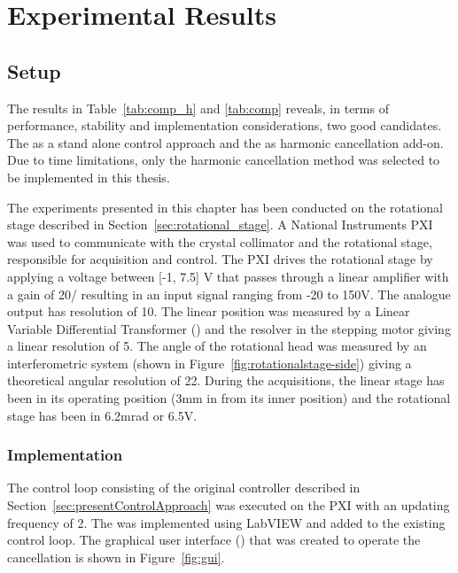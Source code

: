 \chapter{Experimental Results}\label{cha:exp_result}
\section{Setup}\label{sec:setup}
The results in Table~\ref{tab:comp_h} and \ref{tab:comp} reveals, in terms of performance, stability and implementation considerations, two good candidates. The \abbrIRC as a stand alone control approach and the \abbrRFDC as harmonic cancellation add-on. Due to time limitations, only the harmonic cancellation method was selected to be implemented in this thesis.

The experiments presented in this chapter has been conducted on the rotational stage described in Section~\ref{sec:rotational_stage}. A National Instruments PXI was used to communicate with the crystal collimator and the rotational stage, responsible for acquisition and control. The PXI drives the rotational stage by applying a voltage between [-1, 7.5] V that passes through a linear amplifier with a gain of \unit{20}{\volt/\volt} resulting in an input signal ranging from -20 to 150V. The analogue output has resolution of \unit{10}{\micro\volt}. The linear position was measured by a Linear Variable Differential Transformer (\abbrLVDT) and the resolver in the stepping motor giving a linear resolution of \unit{5}{\micro\meter}. The angle of the rotational head was measured by an interferometric system (shown in Figure~\ref{fig:rotationalstage-side}) giving a theoretical angular resolution of \unit{22}{\pico\radian}. During the acquisitions, the linear stage has been in its operating position (3mm in from its inner position) and the rotational stage has been in 6.2mrad or 6.5V.

\subsection{Implementation}
The control loop consisting of the original controller described in Section~\ref{sec:presentControlApproach} was executed on the PXI with an updating frequency of \unit{2}{\kilo\hertz}. The \abbrRFDC was implemented using LabVIEW and added to the existing control loop. The graphical user interface (\abbrGUI) that was created to operate the cancellation is shown in Figure~\ref{fig:gui}.

